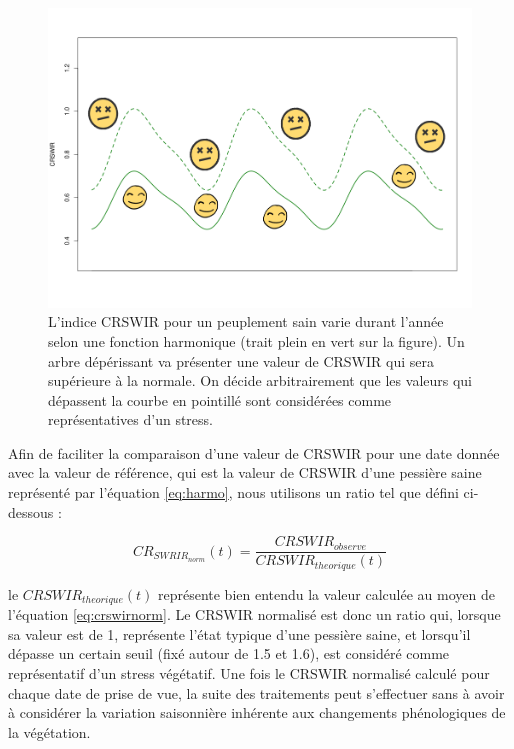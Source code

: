 \documentclass[a4paper, 12pt]{article} %
\begin{document}
\begin{figure}[H]
	\centering
	\includegraphics[width=0.9\linewidth]{fctHarmo.png}
	\caption{L'indice CRSWIR pour un peuplement sain varie durant l'année selon une fonction harmonique (trait plein en vert sur la figure). Un arbre dépérissant va présenter une valeur de CRSWIR qui sera supérieure à la normale. On décide arbitrairement que les valeurs qui dépassent la courbe en pointillé sont considérées comme représentatives d'un stress. }
	\label{fig:harmo}
\end{figure}

Afin de faciliter la comparaison d'une valeur de CRSWIR pour une date donnée avec la valeur de référence, qui est la valeur de CRSWIR d'une pessière saine représenté par l'équation \ref{eq:harmo}, nous utilisons un ratio tel que défini ci-dessous :

\begin{equation}\label{eq:crswirnorm}
CR_{SWRIR_{norm}}(t)=\dfrac{CRSWIR_{observe}}{CRSWIR_{theorique}(t)}
\end{equation} 

le $CRSWIR_{theorique}(t)$ représente bien entendu la valeur calculée au moyen de l'équation \ref{eq:crswirnorm}. Le CRSWIR normalisé est donc un ratio qui, lorsque sa valeur est de 1, représente l'état typique d'une pessière saine, et lorsqu'il dépasse un certain seuil (fixé autour de 1.5 et 1.6), est considéré comme représentatif d'un stress végétatif. Une fois le CRSWIR normalisé calculé pour chaque date de prise de vue, la suite des traitements peut s'effectuer sans à avoir à considérer la variation saisonnière inhérente aux changements phénologiques de la végétation.
\end{document}
